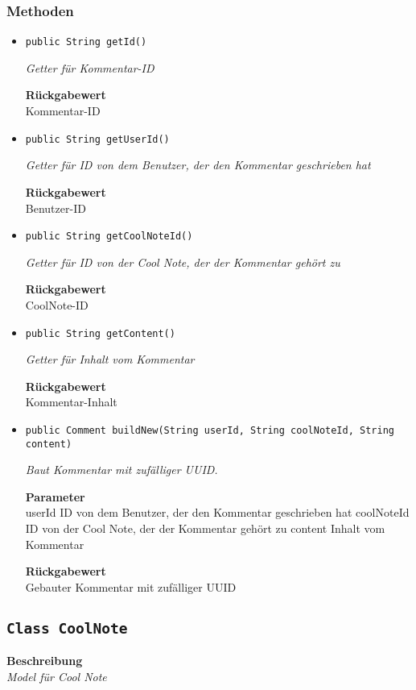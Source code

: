     \subsubsection*{Methoden}
    \begin{itemize}
    	\item{\texttt{public String getId()}}
    	
    	\textit{Getter für Kommentar-ID}
    	
    	
    	
    	\textbf{Rückgabewert} \\
    	Kommentar-ID        \item{\texttt{public String getUserId()}}
    	
    	\textit{Getter für ID von dem Benutzer, der den Kommentar geschrieben hat}
    	
    	
    	
    	\textbf{Rückgabewert} \\
    	Benutzer-ID        \item{\texttt{public String getCoolNoteId()}}
    	
    	\textit{Getter für ID von der Cool Note, der der Kommentar gehört zu}
    	
    	
    	
    	\textbf{Rückgabewert} \\
    	CoolNote-ID        \item{\texttt{public String getContent()}}
    	
    	\textit{Getter für Inhalt vom Kommentar}
    	
    	
    	
    	\textbf{Rückgabewert} \\
    	Kommentar-Inhalt        \item{\texttt{public Comment buildNew(String userId, String coolNoteId, String content)}}
    	
    	\textit{Baut Kommentar mit zufälliger UUID.}
    	
    	\textbf{Parameter} \\
    	userId ID von dem Benutzer, der den Kommentar geschrieben hat
    	coolNoteId ID von der Cool Note, der der Kommentar gehört zu
    	content Inhalt vom Kommentar
    	
    	\textbf{Rückgabewert} \\
    	Gebauter Kommentar mit zufälliger UUID
    \end{itemize}
    \subsection{\texttt{Class CoolNote}}
    \textbf{Beschreibung} \\
    \textit{Model für Cool Note}
